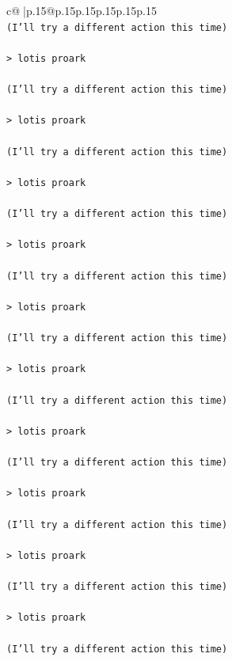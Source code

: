 \documentclass{article}
\begin{document}
{\begin{supertabular}{c@{$\;$}|p{.15\linewidth}@{}p{.15\linewidth}p{.15\linewidth}p{.15\linewidth}p{.15\linewidth}p{.15\linewidth}}
{{{\\ 
\texttt{(I'll try a different action this time) } \\
\\ 
\texttt{> lotis proark } \\
\\ 
\texttt{(I'll try a different action this time) } \\
\\ 
\texttt{> lotis proark } \\
\\ 
\texttt{(I'll try a different action this time) } \\
\\ 
\texttt{> lotis proark } \\
\\ 
\texttt{(I'll try a different action this time) } \\
\\ 
\texttt{> lotis proark } \\
\\ 
\texttt{(I'll try a different action this time) } \\
\\ 
\texttt{> lotis proark } \\
\\ 
\texttt{(I'll try a different action this time) } \\
\\ 
\texttt{> lotis proark } \\
\\ 
\texttt{(I'll try a different action this time) } \\
\\ 
\texttt{> lotis proark } \\
\\ 
\texttt{(I'll try a different action this time) } \\
\\ 
\texttt{> lotis proark } \\
\\ 
\texttt{(I'll try a different action this time) } \\
\\ 
\texttt{> lotis proark } \\
\\ 
\texttt{(I'll try a different action this time) } \\
\\ 
\texttt{> lotis proark } \\
\\ 
\texttt{(I'll try a different action this time) } \\
}}}
\end{supertabular}}
\end{document}
